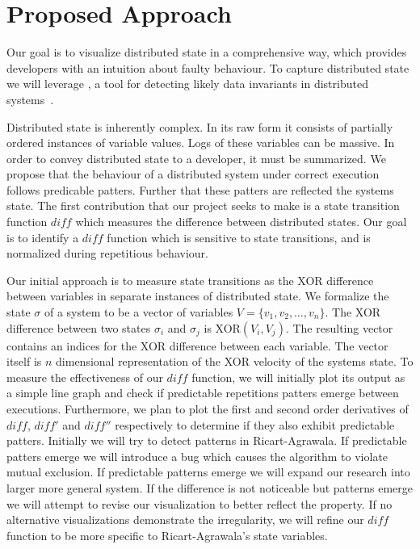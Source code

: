 \section{Proposed Approach}
\label{sec:proposed-approach}

Our goal is to visualize distributed state in a comprehensive way,
which provides developers with an intuition about faulty behaviour. To
capture distributed state we will leverage \dinv, a tool for detecting
likely data invariants in distributed systems~\cite{dinv}.

Distributed state is inherently complex. In its raw form it consists
of partially ordered instances of variable values. Logs of these
variables can be massive. In order to convey distributed state to a
developer, it must be summarized. We propose that the behaviour of a
distributed system under correct execution follows predicable patters.
Further that these patters are reflected the systems state.  The first
contribution that our project seeks to make is a state transition
function $diff$ which measures the difference between distributed
states. Our goal is to identify a $diff$ function which is sensitive
to state transitions, and is normalized during repetitious behaviour.

Our initial approach is to measure state transitions as the XOR
difference between variables in separate instances of distributed
state. We formalize the state $\sigma$ of a system to be a vector of
variables $V = \{v_1,v_2,\dots,v_n\}$. The XOR difference between two
states $\sigma_i$ and $\sigma_j$ is XOR$(V_i,V_j)$. The resulting
vector contains an indices for the XOR difference between each
variable. The vector itself is $n$ dimensional representation of the
XOR velocity of the systems state. To measure the effectiveness of our
$diff$ function, we will initially plot its output as a simple line
graph and check if predictable repetitions patters emerge between
executions.  Furthermore, we plan to plot the first and second order
derivatives of $diff$, $diff'$ and $diff''$ respectively to determine
if they also exhibit predictable patters. Initially we will try to
detect patterns in Ricart-Agrawala. If predictable patters emerge we
will introduce a bug which causes the algorithm to violate mutual
exclusion. If predictable patterns emerge we will expand our research
into larger more general system. If the difference is not noticeable
but patterns emerge we will attempt to revise our visualization to
better reflect the property. If no alternative visualizations
demonstrate the irregularity, we will refine our $diff$ function to be
more specific to Ricart-Agrawala's state variables.
